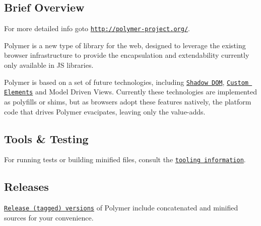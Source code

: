\href{http://build.chromium.org/p/client.polymer/waterfall}{\tt }

\subsection*{Brief Overview}

For more detailed info goto \href{http://polymer-project.org/}{\tt http\+://polymer-\/project.\+org/}.

Polymer is a new type of library for the web, designed to leverage the existing browser infrastructure to provide the encapsulation and extendability currently only available in JS libraries.

Polymer is based on a set of future technologies, including \href{http://w3c.github.io/webcomponents/spec/shadow/}{\tt Shadow D\+OM}, \href{http://w3c.github.io/webcomponents/spec/custom/}{\tt Custom Elements} and Model Driven Views. Currently these technologies are implemented as polyfills or shims, but as browsers adopt these features natively, the platform code that drives Polymer evacipates, leaving only the value-\/adds.

\subsection*{Tools \& Testing}

For running tests or building minified files, consult the \href{https://www.polymer-project.org/resources/tooling-strategy.html}{\tt tooling information}.

\subsection*{Releases}

\href{https://github.com/Polymer/polymer/releases}{\tt Release (tagged) versions} of Polymer include concatenated and minified sources for your convenience.

\href{https://github.com/igrigorik/ga-beacon}{\tt } 